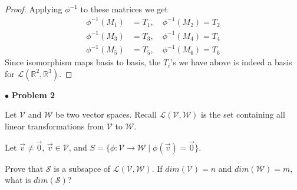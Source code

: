 \documentclass{article}
\begin{document}
\begin{proof}
Applying $\phi^{-1}$ to these matrices we get
\begin{align*}
\phi^{-1}(M_1) &= T_1, \quad \phi^{-1}(M_2) = T_2 \\
\phi^{-1}(M_3) &= T_3, \quad \phi^{-1}(M_4) = T_4 \\
\phi^{-1}(M_5) &= T_5, \quad \phi^{-1}(M_6) = T_6
\end{align*}
Since isomorphism maps basis to basis, the $T_i$'s we have above is indeed a basis for $\mathcal{L}(\mathbb{R}^2, \mathbb{R}^3)$.
\end{proof}

\newpage
$ \bullet$ \textbf{Problem 2}
\medskip

\begin{itshape}
Let $\mathcal{V}$ and $\mathcal{W}$ be two vector spaces. Recall $\mathcal{L}(\mathcal{V}, \mathcal{W})$ is the set containing all linear transformations from $\mathcal{V}$ to $\mathcal{W}$. 

Let $\vec{v} \ne \vec{0}$, $\vec{v} \in \mathcal{V}$, and $S=\{ \phi: \mathcal{V} \to \mathcal{W} \; | \; \phi(\vec{v}) = \vec{0} \}$.

Prove that $\mathcal{S}$ is a subsapce of $\mathcal{L}(\mathcal{V}, \mathcal{W})$. If $dim (\mathcal{V}) =n$ and $dim(\mathcal{W})=m$, what is $dim(\mathcal{S})$?
\end{itshape}
\medskip
\end{document}
